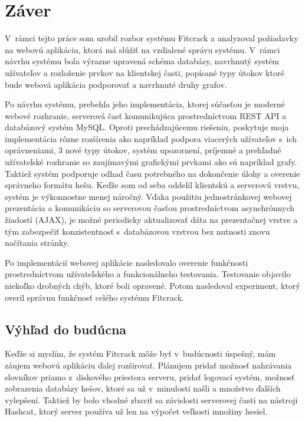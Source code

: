 \documentclass[slovak]{fitthesis}
\begin{document}
\chapter{Záver}\label{zaver}
V~rámci tejto práce som urobil rozbor systému Fitcrack a analyzoval požiadavky na webovú aplikáciu, ktorá má slúžiť na vzdialené správu systému. V~rámci návrhu systému bola výrazne upravená schéma databázy, navrhnutý systém užívateľov a rozloženie prvkov na klientskej časti, popísané typy útokov ktoré bude webová aplikácia podporovať a navrhnuté druhy grafov.

Po návrhu systému, prebehla jeho implementácia, ktorej súčasťou je moderné webové rozhranie, serverová časť komunikujúca prostredníctvom REST API a databázový systém MySQL. Oproti prechádzajúcemu riešeniu, poskytuje moja implementácia rôzne rozšírenia ako napríklad podpora viacerých užívateľov s~ich oprávneniami, 3 nové typy útokov, systém upozornení, príjemné a prehľadné užívateľské rozhranie so zaujímavými grafickými prvkami ako sú napríklad grafy. Taktiež systém podporuje odhad času potrebného na dokončenie úlohy a overenie správneho formátu hešu. Keďže som od seba oddelil klientskú a serverovú vrstvu, systém je výkonnostne menej náročný. Vďaka použitiu jednostránkovej webovej prezentácia a komunikáciu so serverovou časťou prostredníctvom asynchrónnych žiadostí (AJAX), je možné periodicky aktualizovať dáta na prezentačnej vrstve a tým zabezpečiť konzistentnosť s~databázovou vrstvou bez nutnosti znovu načítania stránky.

Po implementácií webovej aplikácie nasledovalo overenie funkčnosti prostredníctvom užívateľského a funkcionálneho testovania. Testovanie objavilo niekoľko drobných chýb, ktoré boli opravené. Potom nasledoval experiment, ktorý overil správnu funkčnosť celého systému Fitcrack.


\section{Výhľad do budúcna}
Keďže si myslím, že systém Fitcrack môže byť v~budúcnosti úspešný, mám záujem webovú aplikáciu ďalej rozširovať. Plánujem pridať možnosť nahrávania slovníkov priamo z~diskového priestora serveru, pridať logovací systém, možnosť zobrazenia databázy hešov, ktoré sa už v~minulosti našli a množstvo ďalších vylepšení. Taktiež by bolo vhodné zbaviť sa závislosti serverovej časti na nástroji Hashcat, ktorý server používa už len na výpočet veľkosti množiny hesiel.
\end{document}
